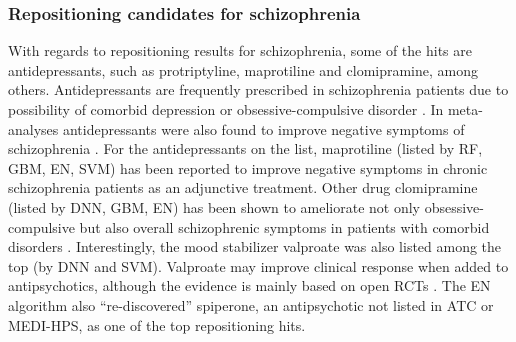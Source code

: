     \subsubsection{Repositioning candidates for schizophrenia}
      With regards to repositioning results for schizophrenia, some of the hits are antidepressants, such as protriptyline, maprotiline and clomipramine, among others. Antidepressants are frequently prescribed in schizophrenia patients due to possibility of comorbid depression or obsessive-compulsive disorder \cite{mao2015augmentation}. In meta-analyses antidepressants were also found to improve negative symptoms of schizophrenia \cite{sigalas2012metyrapone,sepehry2007selective}. For the antidepressants on the list, maprotiline (listed by RF, GBM, EN, SVM) has been reported to improve negative symptoms in chronic schizophrenia patients \cite{yamagami1989effect} as an adjunctive treatment. Other drug clomipramine (listed by DNN, GBM, EN) has been shown to ameliorate not only obsessive-compulsive but also overall schizophrenic symptoms in patients with comorbid disorders \cite{berman1995treatment}. Interestingly, the mood stabilizer valproate was also listed among the top (by DNN and SVM). Valproate may improve clinical response when added to antipsychotics, although the evidence is mainly based on open RCTs \cite{schwarz2008valproate}. The EN algorithm also “re-discovered” spiperone, an antipsychotic not listed in ATC or MEDI-HPS, as one of the top repositioning hits. 

